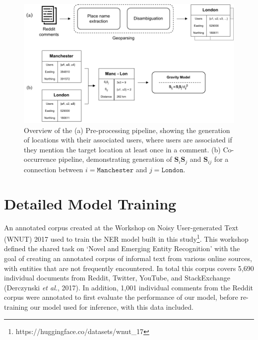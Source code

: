 \documentclass[
  letterpaper,
  11pt,
  english,
  onehalfspacing,
  headsepline]{MastersDoctoralThesis}
\begin{document}
\begin{figure}

{\centering \includegraphics{appendices/appendices_figures/workflow_c.pdf}

}

\caption{\label{fig-workflow2}Overview of the (a) Pre-processing
pipeline, showing the generation of locations with their associated
users, where users are associated if they mention the target location at
least once in a comment. (b) Co-occurrence pipeline, demonstrating
generation of \(\mathbf{S}_i\mathbf{S}_j\) and \(\mathbf{S}_{ij}\) for a
connection between \(i = \texttt{Manchester}\) and
\(j = \texttt{London}\).}

\end{figure}

\hypertarget{detailed-model-training}{%
\section{Detailed Model Training}\label{detailed-model-training}}

An annotated corpus created at the Workshop on Noisy User-generated Text
(WNUT) 2017 used to train the NER model built in this study\footnote{https://huggingface.co/datasets/wnut\_17}.
This workshop defined the shared task on `Novel and Emerging Entity
Recognition' with the goal of creating an annotated corpus of informal
text from various online sources, with entities that are not frequently
encountered. In total this corpus covers 5,690 individual documents from
Reddit, Twitter, YouTube, and StackExchange (Derczynski \emph{et al.},
2017). In addition, 1,001 individual comments from the Reddit corpus
were annotated to first evaluate the performance of our model, before
re-training our model used for inference, with this data included.
\end{document}

